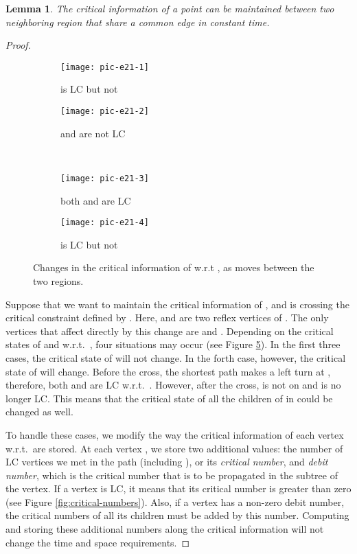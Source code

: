 \documentclass[5p]{elsarticle}
\newtheorem{lemma}[theorem]{Lemma}
\begin{document}
\begin{lemma} \label{lem:lemma5}
The critical information of a point can be maintained
between two neighboring region that share a common edge in constant time.
\end{lemma}
\begin{proof}
\begin{figure}	
	\centering
	\begin{subfigure}[b]{0.23\textwidth}
		\centering
		\texttt{[image: pic-e21-1]}
		\caption{ is LC but not }\label{fig:e2-1a}		
	\end{subfigure}
	\begin{subfigure}[b]{0.23\textwidth}
		\centering
		\texttt{[image: pic-e21-2]}
		\caption{ and  are not LC}\label{fig:e2-1b}		
	\end{subfigure}
	\\
	\begin{subfigure}[b]{0.23\textwidth}
		\centering
		\texttt{[image: pic-e21-3]}
		\caption{both  and  are LC}\label{fig:e2-1c}		
	\end{subfigure}
	\begin{subfigure}[b]{0.23\textwidth}
		\centering
		\texttt{[image: pic-e21-4]}
		\caption{ is LC but not }\label{fig:e2-1d}		
	\end{subfigure}
  \caption{Changes in the critical information of  w.r.t , as  moves between the two regions.}
  \label{fig:e2-1}
\end{figure}


Suppose that we want to maintain the critical
information of , and  is crossing the critical constraint
defined by . Here,  and  are two 
reflex vertices of . The only vertices that affect directly by this change
are  and . Depending on the critical states of  and 
w.r.t.\ , four situations may occur (see Figure \ref{fig:e2-1}). In the
first three cases, the critical state of  will not change. In
the forth case, however, the critical state of  will change.
Before the cross, the shortest path  makes a left turn at ,
therefore, both  and  are LC w.r.t.\ . However, after the cross, 
 is not on  and  is no longer LC. 
This means that the critical state of all the children of 
 in  could be changed as well.

To handle these cases, we modify the way the critical information of each vertex 
w.r.t.\  are stored. At each vertex , we store two additional values: the number 
of LC vertices we met in the path  (including ), or its {\em critical number}, 
and {\em debit number}, which is the critical number that is to be propagated in the 
subtree of the vertex. If a vertex is LC, it means that its critical number 
is greater than zero (see Figure \ref{fig:critical-numbers}). Also, if a vertex has 
a non-zero debit number, the critical numbers of all its children must be added by this
number. Computing and storing these additional numbers along the critical information 
will not change the time and space requirements.


\end{proof}
\end{document}
